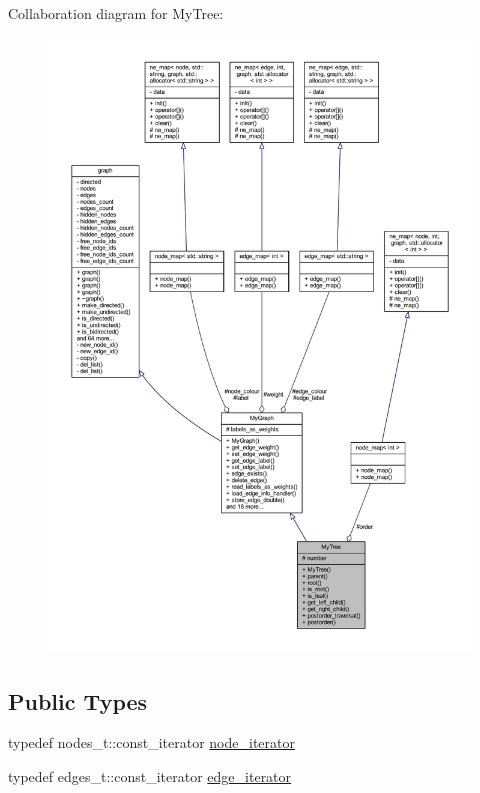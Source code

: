Collaboration diagram for My\+Tree\+:\nopagebreak
\begin{figure}[H]
\begin{center}
\leavevmode
\includegraphics[width=350pt]{class_my_tree__coll__graph}
\end{center}
\end{figure}
\subsection*{Public Types}
\begin{DoxyCompactItemize}
\item 
typedef nodes\+\_\+t\+::const\+\_\+iterator \mbox{\hyperlink{classgraph_a2cb374b84c133ce13f94e73c3e5da7fa}{node\+\_\+iterator}}
\item 
typedef edges\+\_\+t\+::const\+\_\+iterator \mbox{\hyperlink{classgraph_a818d3766018eb0af91d520ce2150203c}{edge\+\_\+iterator}}
\end{DoxyCompactItemize}
